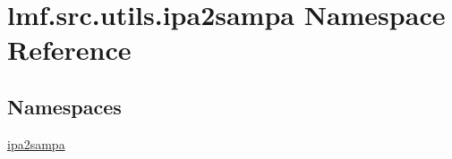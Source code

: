 \hypertarget{namespacelmf_1_1src_1_1utils_1_1ipa2sampa}{\section{lmf.\+src.\+utils.\+ipa2sampa Namespace Reference}
\label{namespacelmf_1_1src_1_1utils_1_1ipa2sampa}
}
\subsection*{Namespaces}
\begin{DoxyCompactItemize}
\item 
 \hyperlink{namespacelmf_1_1src_1_1utils_1_1ipa2sampa_1_1ipa2sampa}{ipa2sampa}
\end{DoxyCompactItemize}

